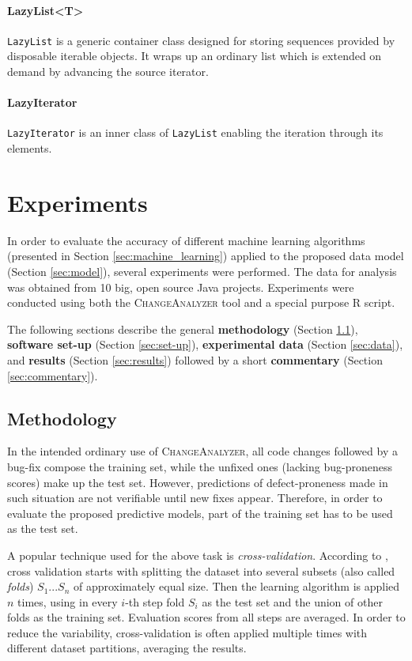 \documentclass{pracamgr}
\newcommand{\ca}{\textsc{ChangeAnalyzer}\xspace}
\begin{document}
\subsubsection*{LazyList<T>}
\texttt{LazyList} is a generic container class designed for storing sequences provided by disposable iterable objects. It wraps up an ordinary list which is extended on demand by advancing the source iterator.

\subsubsection*{LazyIterator}
\texttt{LazyIterator} is an inner class of \texttt{LazyList} enabling the iteration through its elements.

\chapter{Experiments}
\label{cha:experiments}
In order to evaluate the accuracy of different machine learning algorithms (presented in Section \ref{sec:machine_learning}) applied to the proposed data model (Section \ref{sec:model}), several experiments were performed. The data for analysis was obtained from 10 big, open source Java projects. Experiments were conducted using both the \ca tool and a special purpose R script.

The following sections describe the general \textbf{methodology} (Section \ref{sec:methodology}), \textbf{software set-up} (Section \ref{sec:set-up}), \textbf{experimental data} (Section \ref{sec:data}), and \textbf{results} (Section \ref{sec:results}) followed by a short \textbf{commentary} (Section \ref{sec:commentary}).

\section{Methodology}
\label{sec:methodology}
In the intended ordinary use of \ca, all code changes followed by a bug-fix compose the training set, while the unfixed ones (lacking bug-proneness scores) make up the test set. However, predictions of defect-proneness made in such situation are not verifiable until new fixes appear. Therefore, in order to evaluate the proposed predictive models, part of the training set has to be used as the test set.

A popular technique used for the above task is \emph{cross-validation}. According to \cite[p. 249]{encyclopedia}, cross validation starts with splitting the dataset into several subsets (also called \emph{folds}) $S_1 ... S_n$ of approximately equal size. Then the learning algorithm is applied $n$ times, using in every $i$-th step fold $S_i$ as the test set and the union of other folds as the training set. Evaluation scores from all steps are averaged. In order to reduce the variability, cross-validation is often applied multiple times with different dataset partitions, averaging the results.
\end{document}
